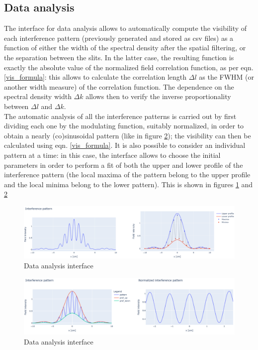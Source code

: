 \subsection{Data analysis}

The interface for data analysis allows to automatically compute the visibility of each interference pattern (previously generated and stored as csv files) as 
a function of either the width of the spectral density after the spatial filtering, or the separation between the slits. In the latter case, the resulting 
function is exactly the absolute value of the normalized field correlation function, as per eqn. \eqref{vis_formula}: this allows to calculate the correlation 
length $\Delta l$ as the FWHM (or another width measure) of the correlation function. The dependence on the spectral density width $\Delta k$ allows then to 
verify the inverse proportionality between $\Delta l$ and $\Delta k$. \\

The automatic analysis of all the interference patterns is carried out by first dividing each one by the modulating function, suitably normalized, in order 
to obtain a nearly (co)sinusoidal pattern (like in figure \ref{data_an_2}); the visibility can then be calculated using eqn. \eqref{vis_formula}. 
It is also possible to consider an individual pattern at a time: in this case, the interface allows to choose the initial parameters in order to perform a 
fit of both the upper and lower profile of the interference pattern (the local maxima of the pattern belong to the upper profile and the local minima belong 
to the lower pattern). This is shown in figures \ref{data_an_1} and \ref{data_an_2}

\begin{figure}[!ht]
    \centering
    \includegraphics[width = \textwidth]{Img/an_11.png}
    \caption{Data analysis interface}
    \label{data_an_1}
\end{figure}

\begin{figure}[!ht]
    \centering
    \includegraphics[width = \textwidth]{Img/an_22.png}
    \caption{Data analysis interface}
    \label{data_an_2}
\end{figure}

